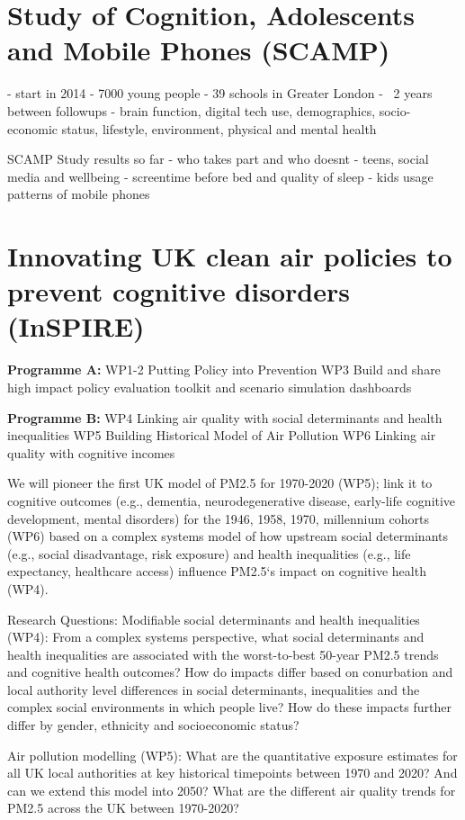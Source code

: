 \section{Study of Cognition, Adolescents and Mobile Phones (SCAMP)}

- start in 2014
- 7000 young people
- 39 schools in Greater London
- ~2 years between followups
- brain function, digital tech use, demographics, socio-economic status, lifestyle, environment, physical and mental health

SCAMP Study results so far
- who takes part and who doesnt
- teens, social media and wellbeing
- screentime before bed and quality of sleep
- kids usage patterns of mobile phones

\section{Innovating UK clean air policies to prevent cognitive disorders (InSPIRE)}

\textbf{Programme A:}
WP1-2 Putting Policy into Prevention
WP3 Build and share high impact policy evaluation toolkit and scenario simulation dashboards

\textbf{Programme B:}
WP4 Linking air quality with social determinants and health inequalities
WP5 Building Historical Model of Air Pollution
WP6 Linking air quality with cognitive incomes

We will pioneer the first UK model of PM2.5 for 1970-2020 (WP5); link it to cognitive outcomes (e.g., dementia, neurodegenerative disease, early-life cognitive development, mental disorders) for the 1946, 1958, 1970, millennium cohorts (WP6) based on a complex systems model of how upstream social determinants (e.g., social disadvantage, risk exposure) and health inequalities (e.g., life expectancy, healthcare access) influence PM2.5‘s impact on cognitive health (WP4).

Research Questions:
Modifiable social determinants and health inequalities (WP4): From a complex systems perspective, what social determinants and health inequalities are associated with the worst-to-best 50-year PM2.5 trends and cognitive health outcomes? How do impacts differ based on conurbation and local authority level differences in social determinants, inequalities and the complex social environments in which people live? How do these impacts further differ by gender, ethnicity and socioeconomic status?

Air pollution modelling (WP5):
What are the quantitative exposure estimates for all UK local authorities at key historical timepoints between 1970 and 2020? And can we extend this model into 2050?
What are the different air quality trends for PM2.5 across the UK between 1970-2020?

